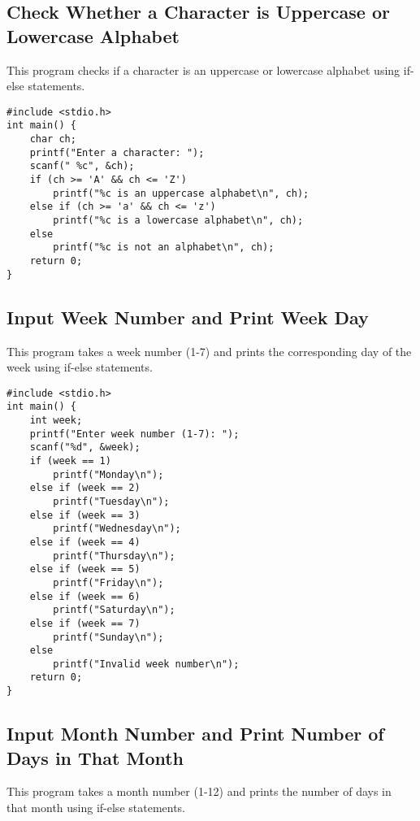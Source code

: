 \documentclass[a4paper,12pt]{article}
\begin{document}
\newpage

\subsection{Check Whether a Character is Uppercase or Lowercase Alphabet}
This program checks if a character is an uppercase or lowercase alphabet using if-else statements.

\begin{lstlisting}[caption={Check Whether a Character is Uppercase or Lowercase Alphabet}]
#include <stdio.h>
int main() {
    char ch;
    printf("Enter a character: ");
    scanf(" %c", &ch);
    if (ch >= 'A' && ch <= 'Z')
        printf("%c is an uppercase alphabet\n", ch);
    else if (ch >= 'a' && ch <= 'z')
        printf("%c is a lowercase alphabet\n", ch);
    else
        printf("%c is not an alphabet\n", ch);
    return 0;
}
\end{lstlisting}

\newpage

\subsection{Input Week Number and Print Week Day}
This program takes a week number (1-7) and prints the corresponding day of the week using if-else statements.

\begin{lstlisting}[caption={Input Week Number and Print Week Day}]
#include <stdio.h>
int main() {
    int week;
    printf("Enter week number (1-7): ");
    scanf("%d", &week);
    if (week == 1)
        printf("Monday\n");
    else if (week == 2)
        printf("Tuesday\n");
    else if (week == 3)
        printf("Wednesday\n");
    else if (week == 4)
        printf("Thursday\n");
    else if (week == 5)
        printf("Friday\n");
    else if (week == 6)
        printf("Saturday\n");
    else if (week == 7)
        printf("Sunday\n");
    else
        printf("Invalid week number\n");
    return 0;
}
\end{lstlisting}

\newpage

\subsection{Input Month Number and Print Number of Days in That Month}
This program takes a month number (1-12) and prints the number of days in that month using if-else statements.
\end{document}
